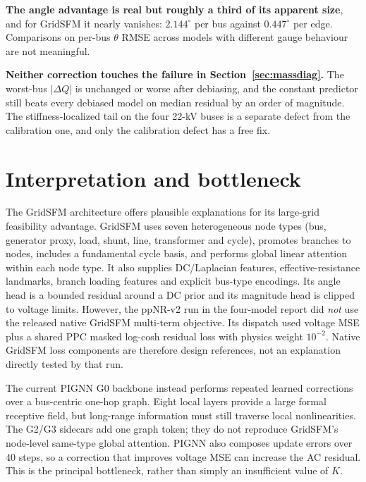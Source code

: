 \documentclass[10pt]{article}
\begin{document}
\textbf{The angle advantage is real but roughly a third of its apparent size},
and for GridSFM it nearly vanishes: $2.144^\circ$ per bus against $0.447^\circ$
per edge.  Comparisons on per-bus $\theta$ RMSE across models with different
gauge behaviour are not meaningful.

\textbf{Neither correction touches the failure in
Section~\ref{sec:massdiag}.}  The worst-bus $|\Delta Q|$ is unchanged or worse
after debiasing, and the constant predictor still beats every debiased model on
median residual by an order of magnitude.  The stiffness-localized tail on the
four 22-kV buses is a separate defect from the calibration one, and only the
calibration defect has a free fix.

\section{Interpretation and bottleneck}

The GridSFM architecture offers plausible explanations for its large-grid
feasibility advantage.
GridSFM uses seven heterogeneous node types (bus, generator proxy, load,
shunt, line, transformer and cycle), promotes branches to nodes, includes a
fundamental cycle basis, and performs global linear attention within each node
type.  It also supplies DC/Laplacian features, effective-resistance landmarks,
branch loading features and explicit bus-type encodings.  Its angle head is a
bounded residual around a DC prior and its magnitude head is clipped to voltage
limits.  However, the ppNR-v2 run in the four-model report did \emph{not} use
the released native GridSFM multi-term objective.  Its dispatch used voltage
MSE plus a shared PPC masked log-cosh residual loss with physics weight
$10^{-2}$.  Native GridSFM loss components are therefore design references,
not an explanation directly tested by that run.

The current PIGNN G0 backbone instead performs repeated learned corrections
over a bus-centric one-hop graph.  Eight local layers provide a large formal
receptive field, but long-range information must still traverse local
nonlinearities.  The G2/G3 sidecars add one graph token; they do not reproduce
GridSFM's node-level same-type global attention.  PIGNN also composes update
errors over 40 steps, so a correction that improves voltage MSE can increase
the AC residual.  This is the principal bottleneck, rather than simply an
insufficient value of $K$.
\end{document}
